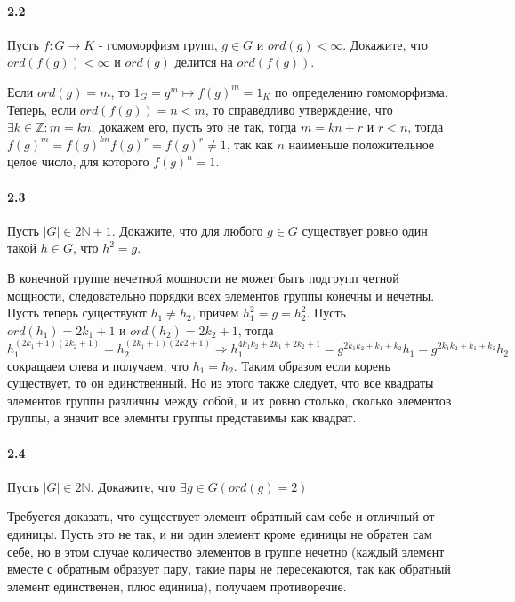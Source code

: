 \documentclass[a4paper,12pt]{article}
\begin{document}
\paragraph{2.2} Пусть $f: G \rightarrow K$ - гомоморфизм групп, $g \in G$ и $ord(g) < \infty$. Докажите, что $ord(f(g)) < \infty$ и $ord(g)$ делится на $ord(f(g))$.

\begin{Solution}
Если $ord(g) = m$, то $1_G = g^m \mapsto f(g)^m = 1_K$ по определению гомоморфизма. Теперь, если $ord(f(g)) = n < m$, то справедливо утверждение, что $\exists k \in \mathbb{Z} : m = kn$, докажем его, пусть это не так, тогда $m = kn + r$ и $r < n$, тогда $f(g)^m = f(g)^{kn}f(g)^r = f(g)^r \not= 1$, так как $n$ наименьше положительное целое число, для которого $f(g)^n = 1$.
\end{Solution}

\paragraph{2.3} Пусть $|G| \in 2\mathbb{N} + 1$. Докажите, что для любого $g \in G$ существует ровно один такой $h \in G$, что $h^2 = g$.

\begin{Solution}
В конечной группе нечетной мощности не может быть подгрупп четной мощности, следовательно порядки всех элементов группы конечны и нечетны. Пусть теперь существуют $h_1 \not = h_2$, причем $h_1^2 = g = h_2^2$. Пусть $ord(h_1) = 2 k_1 + 1$ и $ord(h_2) = 2 k_2 + 1$, тогда $h_1^{(2k_1 + 1)(2k_2 + 1)} = h_2^{(2 k_1 + 1)(2 k2 + 1)} \Rightarrow h_1^{4 k_1 k_2 + 2 k_1 + 2 k_2 + 1} = g^{2k_1k_2 + k_1 + k_2}h_1 = g^{2k_1 k_2 + k_1 + k_2}h_2$ сокращаем слева и получаем, что $h_1 = h_2$. Таким образом если корень существует, то он единственный. Но из этого также следует, что все квадраты элементов группы различны между собой, и их ровно столько, сколько элементов группы, а значит все элемнты группы представимы как квадрат.
\end{Solution}

\paragraph{2.4} Пусть $|G| \in 2\mathbb{N}$. Докажите, что $\exists g \in G (ord(g) = 2)$

\begin{Solution}
Требуется доказать, что существует элемент обратный сам себе и отличный от единицы. Пусть это не так, и ни один элемент кроме единицы не обратен сам себе, но в этом случае количество элементов в группе нечетно (каждый элемент вместе с обратным образует пару, такие пары не пересекаются, так как обратный элемент единственен, плюс единица), получаем противоречие.
\end{Solution}
\end{document}

